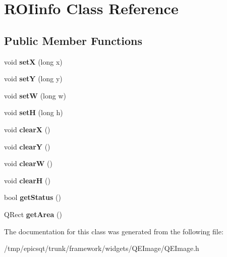 \hypertarget{classROIinfo}{
\section{ROIinfo Class Reference}
\label{classROIinfo}
}
\subsection*{Public Member Functions}
\begin{DoxyCompactItemize}
\item 
\hypertarget{classROIinfo_a921b44f0a70cdde2e53f5b856fc1c12a}{
void {\bfseries setX} (long x)}
\label{classROIinfo_a921b44f0a70cdde2e53f5b856fc1c12a}

\item 
\hypertarget{classROIinfo_a7f7f70fe24c7b736e601f386210bbb3a}{
void {\bfseries setY} (long y)}
\label{classROIinfo_a7f7f70fe24c7b736e601f386210bbb3a}

\item 
\hypertarget{classROIinfo_a6ac624e403345c6f0a11cffc8c161f42}{
void {\bfseries setW} (long w)}
\label{classROIinfo_a6ac624e403345c6f0a11cffc8c161f42}

\item 
\hypertarget{classROIinfo_aa476b24a70d9509e58a23fed465731b4}{
void {\bfseries setH} (long h)}
\label{classROIinfo_aa476b24a70d9509e58a23fed465731b4}

\item 
\hypertarget{classROIinfo_ae48abefd2e8645dbc88e4d77cee15a1e}{
void {\bfseries clearX} ()}
\label{classROIinfo_ae48abefd2e8645dbc88e4d77cee15a1e}

\item 
\hypertarget{classROIinfo_ad99be36fa7c32ab4b33577d8ca0f9f7b}{
void {\bfseries clearY} ()}
\label{classROIinfo_ad99be36fa7c32ab4b33577d8ca0f9f7b}

\item 
\hypertarget{classROIinfo_a3e919305c2c37d5cca7c828d5a198263}{
void {\bfseries clearW} ()}
\label{classROIinfo_a3e919305c2c37d5cca7c828d5a198263}

\item 
\hypertarget{classROIinfo_a1dd8c3a9ed35e37a12f56ed7f2d626d1}{
void {\bfseries clearH} ()}
\label{classROIinfo_a1dd8c3a9ed35e37a12f56ed7f2d626d1}

\item 
\hypertarget{classROIinfo_a8ac3708bcb51a9fb132f5d5bcf98bc14}{
bool {\bfseries getStatus} ()}
\label{classROIinfo_a8ac3708bcb51a9fb132f5d5bcf98bc14}

\item 
\hypertarget{classROIinfo_a1cfc82046d5dbfe76225abc8a51d84c9}{
QRect {\bfseries getArea} ()}
\label{classROIinfo_a1cfc82046d5dbfe76225abc8a51d84c9}

\end{DoxyCompactItemize}


The documentation for this class was generated from the following file:\begin{DoxyCompactItemize}
\item 
/tmp/epicsqt/trunk/framework/widgets/QEImage/QEImage.h\end{DoxyCompactItemize}
